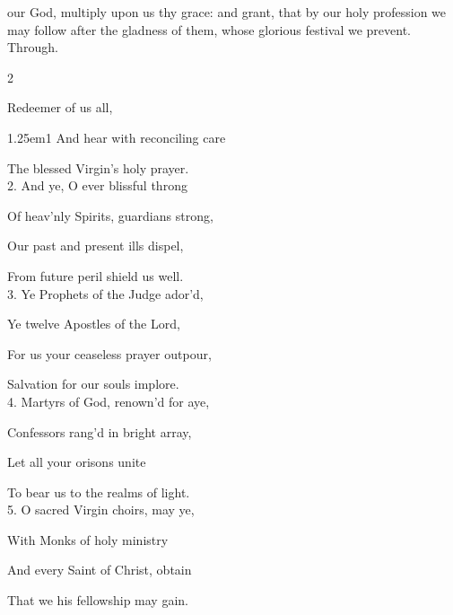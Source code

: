 
{} our God, multiply upon us thy grace: and grant, that by our holy profession we may follow after the gladness of them, whose glorious festival we prevent. Through.


\label{AllHallows}

\begin{paracol}{2}
\sloppy

\firstEvensong
{}

\firstEvensongHymn
{} Redeemer of us all,


\begin{hangparas}{1.25em}{1}
And hear with reconciling care

The blessed Virgin's holy prayer.\\

2. And ye, O ever blissful throng

Of heav'nly Spirits, guardians strong,

Our past and present ills dispel,

From future peril shield us well.\\

3. Ye Prophets of the Judge ador'd,

Ye twelve Apostles of the Lord,

For us your ceaseless prayer outpour,

Salvation for our souls implore.\\

4. Martyrs of God, renown'd for aye,

Confessors rang'd in bright array,

Let all your orisons unite

To bear us to the realms of light.\\

5. O sacred Virgin choirs, may ye,

With Monks of holy ministry

And every Saint of Christ, obtain

That we his fellowship may gain.\\


\end{hangparas}
\end{paracol}
